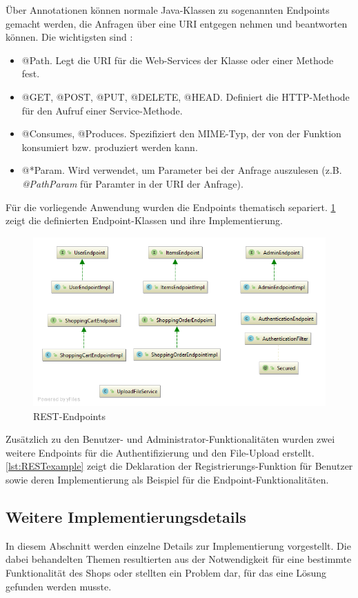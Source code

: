 Über Annotationen können normale Java-Klassen zu sogenannten Endpoints gemacht werden, die Anfragen über eine \acs{URI} entgegen nehmen und beantworten können.
Die wichtigsten sind \cite{Jersey2017a}:

\begin{itemize}
\item{@Path.} Legt die \acs{URI} für die Web-Services der Klasse oder einer Methode fest.
\item{@GET, @POST, @PUT, @DELETE, @HEAD.} Definiert die \acs{HTTP}-Methode für den Aufruf einer Service-Methode.
\item{@Consumes, @Produces.} Spezifiziert den \acs{MIME}-Typ, der von der Funktion konsumiert bzw. produziert werden kann.
\item{@*Param.} Wird verwendet, um Parameter bei der Anfrage auszulesen (z.B. \textit{@PathParam} für Paramter in der \acs{URI} der Anfrage).
\end{itemize}

Für die vorliegende Anwendung wurden die Endpoints thematisch separiert.
\cref{fig:endpoints} zeigt die definierten Endpoint-Klassen und ihre Implementierung.

\begin{figure}[th!]
	\centering
	\includegraphics[width=0.5\linewidth]{bilder/kap7/api_diagram}
	\caption{REST-Endpoints}
	\label{fig:endpoints}
\end{figure}

Zusätzlich zu den Benutzer- und Administrator-Funktionalitäten wurden zwei weitere Endpoints für die Authentifizierung und den File-Upload erstellt.
\\


\cref{lst:RESTexample} zeigt die Deklaration der Registrierungs-Funktion für Benutzer sowie deren Implementierung als Beispiel für die Endpoint-Funktionalitäten.

\subsection{Weitere Implementierungsdetails}
In diesem Abschnitt werden einzelne Details zur Implementierung vorgestellt.
Die dabei behandelten Themen resultierten aus der Notwendigkeit für eine bestimmte Funktionalität des Shops oder stellten ein Problem dar, für das eine Lösung gefunden werden musste.
